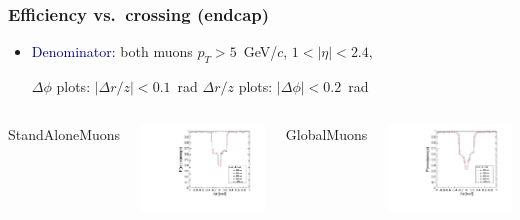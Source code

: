 \documentclass[compress]{beamer}
\begin{document}
\begin{frame}
\frametitle{Efficiency vs.\ crossing (endcap)}
\begin{itemize}
\item \textcolor{darkblue}{Denominator:} both muons $p_T > 5$~GeV/$c$, $1 < |\eta| < 2.4$,

$\Delta \phi$ plots: $|\Delta r/z| < 0.1$~rad \hfill $\Delta r/z$ plots: $|\Delta \phi| < 0.2$~rad
\end{itemize}

\vfill
\begin{columns}
\centering StandAloneMuons

\includegraphics[width=\linewidth]{endcap_dphi_StandAloneMuon.pdf}

\centering GlobalMuons

\includegraphics[width=\linewidth]{endcap_dphi_GlobalMuon.pdf}


\end{columns}
\end{frame}
\end{document}
